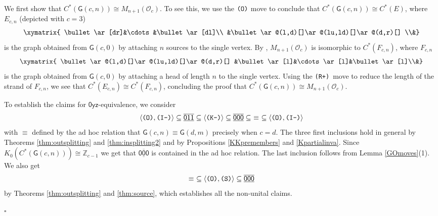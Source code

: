 \documentclass[12pt]{amsbook}%
\theoremstyle{defin}
\theoremstyle{remark}
\numberwithin{equation}{chapter}
\numberwithin{theor}{section}
\newenvironment{proofoffirstpart}[1]{{\sc Proof (first part).}}{\hfill$\square$}
\newcommand{\ZZ}{\mathbb{Z}}
\newcommand{\xyz}[1]{\mbox{$\mathsf{#1}$}}
\newcommand{\xyzrel}[1]{\mbox{$\overline{\underline{\mathsf{ #1}}}$}}
\newcommand{\IIIm}{\mbox{\texttt{\textup{(I-)}}}}
\newcommand{\OOO}{\mbox{\texttt{\textup{(O)}}}}
\newcommand{\RRRp}{\mbox{\texttt{\textup{(R+)}}}}
\newcommand{\KKKm}{\mbox{\texttt{\textup{(K-)}}}}
\newcommand{\SSS}{\mbox{\texttt{\textup{(S)}}}}
\newcommand{\GO}{{\mathsf G}}
\begin{document}
 \begin{proofoffirstpart}{Proposition \ref{cuntzcomplete}}
 We first show that $C^*(\GO(c,n))\cong M_{n+1}(\mathcal O_c)$. To see this, we use the $\OOO$ move to conclude that $C^*(\GO(c, n)) \cong C^*(E)$, where $E_{c,n}$ (depicted with $c=3$) 
 \[
 \xymatrix{
 \bullet\ar[dr]&\cdots&\bullet\ar[dl]\\
 &\bullet\ar@(l,d)[]\ar@(lu,ld)[]\ar@(d,r)[] \\&}
 \]
  is the graph obtained from $\GO(c,0)$ by attaching $n$ sources to the single vertex.  By \cite[Proposition~9.3]{gamt:imega}, $M_{n+1}(\mathcal O_c)$ is isomorphic to $C^*(F_{c,n})$, where $F_{c,n}$ 
  \[
  \xymatrix{
   \bullet\ar@(l,d)[]\ar@(lu,ld)[]\ar@(d,r)[] &\bullet\ar[l]&\cdots\ar[l]&\bullet\ar[l]\\&}
  \]
  is the graph obtained from $\GO(c,0)$ by attaching a head of length $n$ to the single vertex.  Using the \RRRp\ move to reduce the length of the strand of $F_{c,n}$, we see that $C^*(E_{c,n}) \cong C^*(F_{c,n})$, concluding the proof that $C^*(\GO(c, n)) \cong M_{n+1}(\mathcal O_c)$.

To establish the claims for \xyz{0yz}-equivalence, we consider
 \[
\langle\OOO,\IIIm\rangle\subseteq \xyzrel{011}\subseteq \langle\KKKm\rangle\subseteq\xyzrel{000}\subseteq\ \equiv\ \subseteq\langle\OOO,\IIIm\rangle
\]
with $\equiv$ defined by the ad hoc relation that $\GO(c,n)\equiv \GO(d,m)$ precisely when $c=d$. The three first inclusions hold in general by Theorems \ref{thm:outsplitting} and \ref{thm:insplitting2} and by Propositions  \ref{KKpremembers} and \ref{Kpartialinva}. Since $K_0(C^*(\GO(c,n))) \cong \ZZ_{c-1}$ we get that $\xyzrel{000}$ is contained in the ad hoc relation. The last inclusion follows from Lemma \ref{GOmoves}(1). We also get
\[
\equiv\ \subseteq\langle\OOO,\SSS\rangle\subseteq \xyzrel{000}
\]
by Theorems \ref{thm:outsplitting} and \ref{thm:source}, which establishes all the non-unital claims.


\end{proofoffirstpart}
\end{document}
